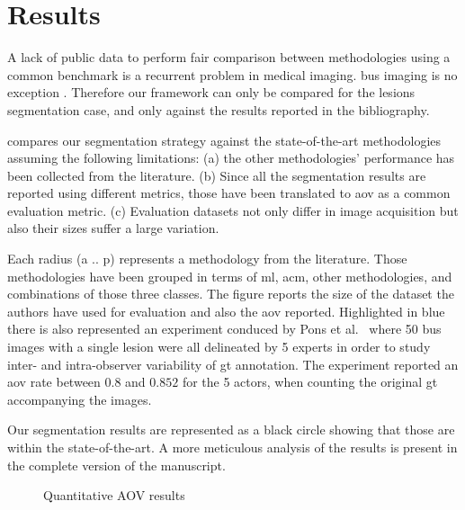 \graphicspath{ {./content/results/figures/} }

\section{Results} 
A lack of public data to perform fair comparison between methodologies using a common benchmark is a recurrent problem in medical imaging.
\ac{bus} imaging is no exception \cite{Cheng:2009p10580}. 
Therefore our framework can only be compared for the lesions segmentation case, and only against the results reported in the bibliography.

 compares our segmentation strategy against the state-of-the-art methodologies assuming the following limitations:
(a) the other methodologies' performance has been collected from the literature. 
(b) Since all the segmentation results are reported using different metrics, those have been translated to \ac{aov} as a common evaluation metric.
(c) Evaluation datasets not only differ in image acquisition but also their sizes suffer a large variation. 

Each radius (a .. p) represents a methodology from the literature.
Those methodologies have been grouped in terms of \ac{ml}, \ac{acm}, other methodologies, and combinations of those three classes.
The figure reports the size of the dataset the authors have used for evaluation and also the \ac{aov} reported. 
Highlighted in blue there is also represented an experiment conduced by Pons et al.~\cite{gerard2013} where 50 \ac{bus} images with a single lesion were all delineated by 5 experts in order to study inter- and intra-observer variability of \ac{gt} annotation. 
The experiment reported an \ac{aov} rate between $0.8$ and $0.852$ for the 5 actors, when counting the original \ac{gt} accompanying the images.

Our segmentation results are represented as a black circle showing that those are within the state-of-the-art. 
A more meticulous analysis of the results is present in the complete version of the manuscript.

\begin{figure}[h]
  \centering
  
  \caption{Quantitative AOV results}
  \label{fig:surveyResults}
\end{figure}


